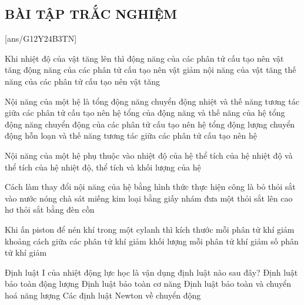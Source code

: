 	\subsection{BÀI TẬP TRẮC NGHIỆM}
	[ans/G12Y24B3TN]
	\begin{ex}
		Khi nhiệt độ của vật tăng lên thì
		\choice
		{\True động năng của các phân tử cấu tạo nên vật tăng}
		{động năng của các phân tử cấu tạo nên vật giảm}
		{nội năng của vật tăng}
		{thế năng của các phân tử cấu tạo nên vật tăng}
		\loigiai{ }
		\end{ex}
	\begin{ex}
Nội năng của một hệ là 
	\choice
	{\True tổng động năng chuyển động nhiệt và thế năng tương tác giữa các phân tử cấu tạo nên hệ}
	{tổng của động năng và thế năng của hệ}
	{tổng động năng chuyển động của các phân tử cấu tạo nên hệ}
	{tổng động lượng chuyển động hỗn loạn và thế năng tương tác giữa các phân tử cấu tạo nên hệ}
	\loigiai{ }
\end{ex}
	\begin{ex}
	Nội năng của một hệ phụ thuộc vào
	\choice
	{nhiệt độ của hệ}
	{thể tích của hệ}
	{\True nhiệt độ và thể tích của hệ}
	{nhiệt độ, thể tích và khối lượng của hệ}
	\loigiai{ }
\end{ex}
	\begin{ex}
Cách làm thay đổi nội năng của hệ bằng hình thức thực hiện công là
	\choice
	{bỏ thỏi sắt vào nước nóng}
	{\True chà sát miếng kim loại bằng giấy nhám}
	{đưa một thỏi sắt lên cao}
	{hơ thỏi sắt bằng đèn cồn}
	\loigiai{ }
\end{ex}
	\begin{ex}
Khi ấn piston để nén khí trong một cylanh thì
	\choice
	{kích thước mỗi phân tử khí giảm}
	{\True khoảng cách giữa các phân tử khí giảm}
	{khối lượng mỗi phân tử khí giảm}
	{số phân tử khí giảm}
	\loigiai{ }
\end{ex}
	\begin{ex}
	Định luật I của nhiệt động lực học là vận dụng định luật nào sau đây?
	\choice
	{Định luật bảo toàn động lượng}
	{Định luật bảo toàn cơ năng}
	{\True Định luật bảo toàn và chuyển hoá năng lượng}
	{Các định luật Newton về chuyển động}
	\loigiai{ }
\end{ex}

